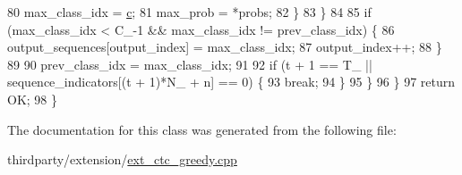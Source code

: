 \begin{DoxyCode}
80                         max\_class\_idx = \hyperlink{CMakeCache_8txt_aac1d6a1710812201527c735f7c6afbaa}{c};
81                         max\_prob = *probs;
82                     \}
83                 \}
84 
85                 \textcolor{keywordflow}{if} (max\_class\_idx < C\_-1 && max\_class\_idx != prev\_class\_idx) \{
86                     output\_sequences[output\_index] =  max\_class\_idx;
87                     output\_index++;
88                 \}
89 
90                 prev\_class\_idx = max\_class\_idx;
91 
92                 \textcolor{keywordflow}{if} (t + 1 == T\_ || sequence\_indicators[(t + 1)*N\_ + n] == 0) \{
93                     \textcolor{keywordflow}{break};
94                 \}
95             \}
96         \}
97         \textcolor{keywordflow}{return} OK;
98     \}
\end{DoxyCode}


The documentation for this class was generated from the following file\+:\begin{DoxyCompactItemize}
\item 
thirdparty/extension/\hyperlink{ext__ctc__greedy_8cpp}{ext\+\_\+ctc\+\_\+greedy.\+cpp}\end{DoxyCompactItemize}
